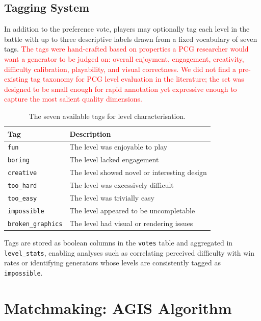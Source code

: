 \documentclass[shortabstract, mgr, english]{iithesis}
\newcommand{\changed}[1]{\textcolor{red}{#1}}
\begin{document}
\subsection{Tagging System}
\label{subsec:sd-tagging}

In addition to the preference vote, players may optionally tag each level in the battle
with up to three descriptive labels drawn from a fixed vocabulary of seven tags.
\changed{The tags were hand-crafted based on properties a PCG researcher would
want a generator to be judged on: overall enjoyment, engagement, creativity,
difficulty calibration, playability, and visual correctness. We did not find
a pre-existing tag taxonomy for PCG level evaluation in the literature; the
set was designed to be small enough for rapid annotation yet expressive enough
to capture the most salient quality dimensions.}

\begin{table}[H]
\centering
\begin{tabular}{ll}
\toprule
\textbf{Tag} & \textbf{Description} \\
\midrule
\texttt{fun}              & The level was enjoyable to play \\
\texttt{boring}           & The level lacked engagement \\
\texttt{creative}         & The level showed novel or interesting design \\
\texttt{too\_hard}        & The level was excessively difficult \\
\texttt{too\_easy}        & The level was trivially easy \\
\texttt{impossible}       & The level appeared to be uncompletable \\
\texttt{broken\_graphics} & The level had visual or rendering issues \\
\bottomrule
\end{tabular}
\caption{The seven available tags for level characterisation.}
\label{tab:tags}
\end{table}

Tags are stored as boolean columns in the \texttt{votes} table and aggregated in
\texttt{level\_stats}, enabling analyses such as correlating perceived difficulty with
win rates or identifying generators whose levels are consistently tagged as
\texttt{impossible}.

\section{Matchmaking: AGIS Algorithm}
\label{sec:sd-matchmaking}
\end{document}
